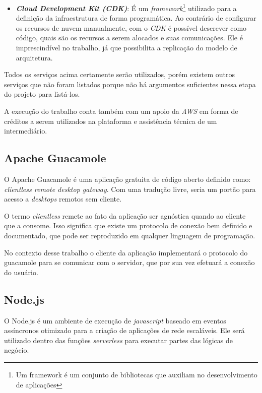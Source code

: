 \begin{itemize}
    \item \textbf{\textit{Cloud Development Kit (CDK)}}: É um \textit{framework}\footnote{Um framework é um conjunto de bibliotecas que auxiliam no desenvolvimento de aplicações} utilizado para a definição da infraestrutura de forma programática. Ao contrário de configurar os recursos de nuvem manualmente, com o \textit{CDK} é possível descrever como código, quais são os recursos a serem alocados e suas comunicações. Ele é imprescindível no trabalho, já que possibilita a replicação do modelo de arquitetura.
    
\end{itemize}

Todos os serviços acima certamente serão utilizados, porém existem outros serviços que não foram listados porque não há argumentos suficientes nessa etapa do projeto para listá-los.

A execução do trabalho conta também com um apoio da \textit{AWS} em forma de créditos a serem utilizados na plataforma e assistência técnica de um intermediário.

\subsection{Apache Guacamole}\label{subsec:apacheGuacamole}

O Apache Guacamole é uma aplicação gratuita de código aberto definido como: \textit{clientless remote desktop gateway}. \citep{apacheguacamole} Com uma tradução livre, seria um portão para acesso a \textit{desktops} remotos sem cliente.

O termo \textit{clientless} remete ao fato da aplicação ser agnóstica quando ao cliente que a consome. Isso significa que existe um protocolo de conexão bem definido e documentado, que pode ser reproduzido em qualquer linguagem de programação. 

No contexto desse trabalho o cliente da aplicação implementará o protocolo do guacamole para se comunicar com o servidor, que por sua vez efetuará a conexão do usuário.


\subsection{Node.js}\label{subsec:nodeJs}

O Node.js é um ambiente de execução de \textit{javascript} baseado em eventos assíncronos otimizado para a criação de aplicações de rede escaláveis. Ele será utilizado dentro das funções \textit{serverless} para executar partes das lógicas de negócio. \citep{nodejs}

